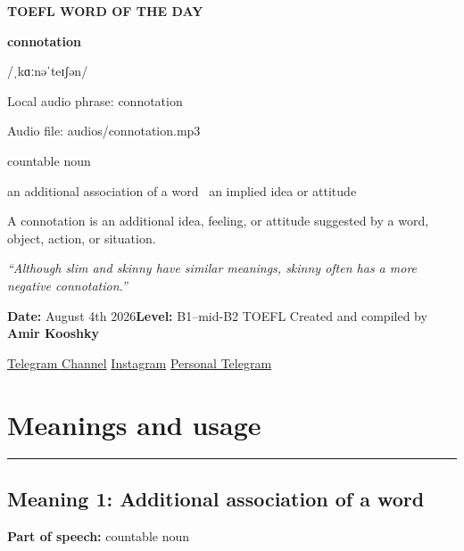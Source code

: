 \documentclass[11pt]{article}
\newcommand{\sectionrule}{\par\vspace{-0.5em}\noindent\textcolor{Accent}{\rule{\linewidth}{0.6pt}}\par}
\begin{document}
\begin{center}
{\sffamily\bfseries\color{Accent} TOEFL WORD OF THE DAY\par}
\vspace{8mm}
{\fontsize{42}{48}\selectfont\bfseries connotation\par}
\vspace{2mm}
{\Large\sffamily\color{Accent} /ˌkɑːnəˈteɪʃən/\par}
\vspace{2mm}
{\small\sffamily Local audio phrase: connotation\par}
{\small\sffamily Audio file: audios/connotation.mp3\par}
\vspace{2mm}
{\large\sffamily\color{Muted} countable noun\par}
\vspace{5mm}
{\sffamily an additional association of a word \textbullet\ an implied idea or attitude\par}
\vspace{6mm}
{\large A connotation is an additional idea, feeling, or attitude suggested by a word, object, action, or situation.\par}
\vspace{6mm}
\begin{minipage}{0.84\textwidth}
\itshape “Although slim and skinny have similar meanings, skinny often has a more negative connotation.”
\end{minipage}\par
\vspace{10mm}
\textbf{Date:} August 4th 2026\quad\textbullet\quad \textbf{Level:} B1--mid-B2 TOEFL
\vfill
Created and compiled by \textbf{Amir Kooshky}\par
\vspace{2mm}
\href{https://t.me/KooshkyTOEFL}{Telegram Channel}\quad\textbullet\quad
\href{https://www.instagram.com/kooshkytoefl}{Instagram}\quad\textbullet\quad
\href{https://t.me/KooshkyTOEFL\_pv}{Personal Telegram}
\end{center}
\newpage
\tableofcontents
\newpage

\section{Meanings and usage}
\sectionrule
\subsection{Meaning 1: Additional association of a word}
\textbf{Part of speech:} countable noun
\end{document}

